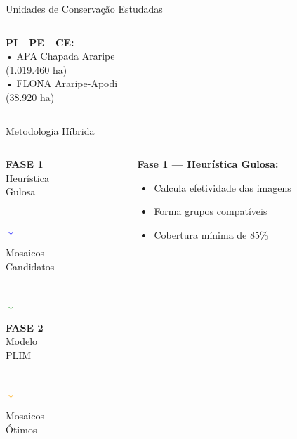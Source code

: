 \documentclass[aspectratio=169,11pt]{beamer}
\begin{document}
\begin{frame}{Unidades de Conservação Estudadas}
\begin{columns}[c]
\begin{column}{0.63\textwidth}
\begin{multicols}{2}
{        \textbf{PI---PE---CE:}\\
        • APA Chapada Araripe\\
        \quad (1.019.460 ha)\\
        • FLONA Araripe-Apodi\\
        \quad (38.920 ha)
        }
        \end{multicols}
    \end{column}
\end{columns}
\end{frame}

\begin{frame}{Metodologia Híbrida}
\vspace{-0.2cm}
\begin{center}
\begin{columns}[c]
    \begin{column}{0.25\textwidth}
        \begin{center}
            \colorbox{blue!20}{\parbox{2.5cm}{\centering\footnotesize\textbf{FASE 1}\\Heurística\\Gulosa}}\\[0.2cm]
            
            \textcolor{blue}{\Large$\downarrow$}\\[0.2cm]
            
            \colorbox{green!20}{\parbox{2.5cm}{\centering\footnotesize Mosaicos\\Candidatos}}\\[0.2cm]
            
            \textcolor{green}{\Large$\downarrow$}\\[0.2cm]
            
            \colorbox{orange!20}{\parbox{2.5cm}{\centering\footnotesize\textbf{FASE 2}\\Modelo\\PLIM}}\\[0.2cm]
            
            \textcolor{orange}{\Large$\downarrow$}\\[0.2cm]
            
            \colorbox{success!30}{\parbox{2.5cm}{\centering\footnotesize Mosaicos\\Ótimos}}
        \end{center}
    \end{column}
    
    \begin{column}{0.7\textwidth}
        \textbf{Fase 1 --- Heurística Gulosa:}
        \begin{itemize}
            \item Calcula efetividade das imagens
            \item Forma grupos compatíveis
            \item Cobertura mínima de 85\%
        \end{itemize}
        

\end{column}
\end{columns}
\end{center}
\end{frame}
\end{document}
